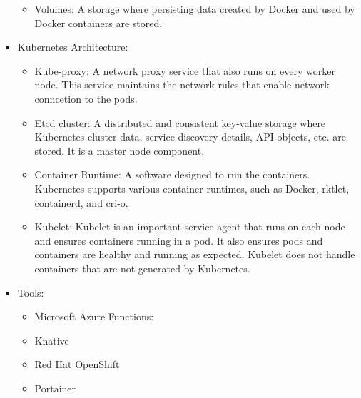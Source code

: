 \begin{itemize}
\begin{itemize}
        \item Volumes: A storage where persisting data created by Docker and used by Docker containers are stored.
    \end{itemize}
    \item Kubernetes Architecture:
    \begin{itemize}
        \item Kube-proxy: A network proxy service that also runs on every worker node. This service maintains the network rules that enable network conncetion to the pods.
        \item Etcd cluster: A distributed and consistent key-value storage where Kubernetes cluster data, service discovery details, API objects, etc. are stored. It is a master node component.
        \item Container Runtime: A software designed to run the containers. Kubernetes supports various container runtimes, such as Docker, rktlet, containerd, and cri-o.
        \item Kubelet: Kubelet is an important service agent that runs on each node and ensures containers running in a pod. It also ensures pods and containers are healthy and running as expected. Kubelet does not handle containers that are not generated by Kubernetes.
    \end{itemize}
    \item Tools:
    \begin{itemize}
        \item Microsoft Azure Functions: 
        \item Knative
        \item Red Hat OpenShift
        \item Portainer
    \end{itemize}
\end{itemize}
